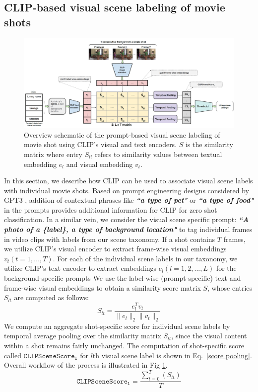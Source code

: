 \subsection{CLIP-based visual scene labeling of movie shots}
\begin{figure}[h]
\centering
\includegraphics[width=\textwidth]{figures/MovieCLIP_tagging_image.png} %
\caption{Overview schematic of the prompt-based visual scene labeling of movie shot using CLIP's visual and text encoders. $S$ is the similarity matrix where entry $S_{lt}$ refers to similarity values between textual embedding $e_{l}$ and visual embedding $v_{t}$.}
\label{clip tagging}
\end{figure}
In this section, we describe how CLIP \cite{CLIP} can be used to associate visual scene labels with individual movie shots. Based on prompt engineering designs considered by GPT3 \cite{GPT3}, addition of contextual phrases like \textit{\textbf{``a type of pet"}} or \textit{\textbf{``a type of food"}} in the prompts provides additional information for CLIP for zero shot classification. In a similar vein, we consider the visual scene specific prompt: \textit{\textbf{``A photo of a \{label\}, a type of background location"}} to tag individual frames in video clips with labels from our scene taxonomy. If a shot contains $T$ frames, we utilize CLIP's visual encoder to extract frame-wise visual embeddings $v_{t}(t=1,...,T)$. For each of the individual scene labels in our taxonomy, we utilize CLIP's text encoder to extract embeddings $e_{l} (l=1,2,...,L)$ for the background-specific prompts 
We use the label-wise (prompt-specific) text and frame-wise visual embeddings to obtain a similarity score matrix $S$, whose entries $S_{lt}$ are computed as follows:
\begin{equation}\label{simmatrixscore}
    S_{lt}=\frac{e_{l}^{T}v_{t}}{\lVert e_{l}  \rVert_{2}  \lVert v_{t} \rVert_{2}}
\end{equation}
We compute an aggregate shot-specific score for individual scene labels by temporal average pooling over the similarity matrix $S_{lt}$, since the visual content within a shot remains fairly unchanged. The computation of shot-specific score called $\texttt{CLIPSceneScore}_{\texttt{l}}$ for $l$th visual scene label is shown in Eq.~\ref{score pooling}.
Overall workflow of the process is illustrated in Fig \ref{clip tagging}.
\begin{equation}
    \texttt{CLIPSceneScore}_{\texttt{l}}=\frac{\sum_{t=0}^{T}(S_{lt})}{T}
    \label{score pooling}
\end{equation}

